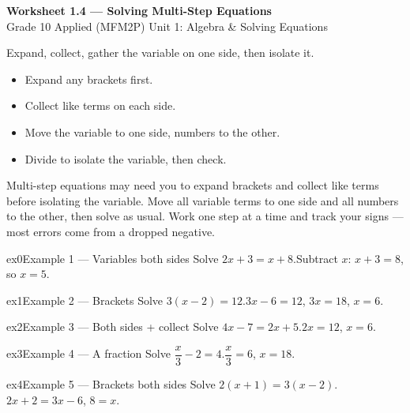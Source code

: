 \documentclass[11pt]{article}
\begin{document}
\begin{center}
{\LARGE\bfseries\color{titleblue}Worksheet 1.4 --- Solving Multi-Step Equations}\\[2pt]
{\small Grade 10 Applied (MFM2P) \textperiodcentered{} Unit 1: Algebra \& Solving Equations}
\end{center}

\begin{ideabox}
Expand, collect, gather the variable on one side, then isolate it.
\begin{itemize}[leftmargin=*,itemsep=2pt]
  \item Expand any brackets first.
  \item Collect like terms on each side.
  \item Move the variable to one side, numbers to the other.
  \item Divide to isolate the variable, then check.
\end{itemize}
\end{ideabox}

\begin{learnbox}
Multi-step equations may need you to expand brackets and collect like terms before isolating the variable.
Move all variable terms to one side and all numbers to the other, then solve as usual.
Work one step at a time and track your signs — most errors come from a dropped negative.
\end{learnbox}


\begin{example}{ex0}{Example 1 --- Variables both sides}
Solve $2x+3=x+8$.\soln Subtract $x$: $x+3=8$, so $x=5$.
\end{example}

\begin{example}{ex1}{Example 2 --- Brackets}
Solve $3(x-2)=12$.\soln $3x-6=12$, $3x=18$, $x=6$.
\end{example}

\begin{example}{ex2}{Example 3 --- Both sides + collect}
Solve $4x-7=2x+5$.\soln $2x=12$, $x=6$.
\end{example}

\begin{example}{ex3}{Example 4 --- A fraction}
Solve $\dfrac{x}{3}-2=4$.\soln $\dfrac{x}{3}=6$, $x=18$.
\end{example}

\begin{example}{ex4}{Example 5 --- Brackets both sides}
Solve $2(x+1)=3(x-2)$.\soln $2x+2=3x-6$, $8=x$.
\end{example}
\end{document}
